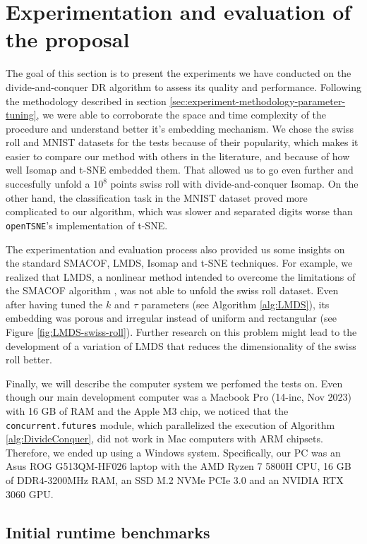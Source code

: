 \section{Experimentation and evaluation of the proposal}
\label{sec:experimentation-and-evaluation}

The goal of this section is to present the experiments we have conducted on the divide-and-conquer DR algorithm to assess its quality and performance. Following the methodology described in section \ref{sec:experiment-methodology-parameter-tuning}, we were able to corroborate the space and time complexity of the procedure and understand better it's embedding mechanism. We chose the swiss roll and MNIST datasets for the tests because of their popularity, which makes it easier to compare our method with others in the literature, and because of how well Isomap and t-SNE embedded them. That allowed us to go even further and succesfully unfold a $10^8$ points swiss roll with divide-and-conquer Isomap. On the other hand, the classification task in the MNIST dataset proved more complicated to our algorithm, which was slower and separated digits worse than \verb|openTSNE|'s implementation of t-SNE.

The experimentation and evaluation process also provided us some insights on the standard SMACOF, LMDS, Isomap and t-SNE techniques. For example, we realized that LMDS, a nonlinear method intended to overcome the limitations of the SMACOF algorithm \citep{Chen2009}, was not able to unfold the swiss roll dataset. Even after having tuned the $k$ and $\tau$ parameters (see Algorithm \ref{alg:LMDS}), its embedding was porous and irregular instead of uniform and rectangular (see Figure \ref{fig:LMDS-swiss-roll}). Further research on this problem might lead to the development of a variation of LMDS that reduces the dimensionality of the swiss roll better.

Finally, we will describe the computer system we perfomed the tests on. Even though our main development computer was a  Macbook Pro (14-inc, Nov 2023) with 16 GB of RAM and the Apple M3 chip, we noticed that the \verb|concurrent.futures| module, which parallelized the execution of Algorithm \ref{alg:DivideConquer}, did not work in Mac computers with ARM chipsets. Therefore, we ended up using a Windows system. Specifically, our PC was an Asus ROG G513QM-HF026 laptop with the AMD Ryzen 7 5800H CPU, 16 GB of DDR4-3200MHz RAM, an SSD M.2 NVMe PCIe 3.0 and an NVIDIA RTX 3060 GPU.

\subsection{Initial runtime benchmarks}
\label{sec:initial-runtime-benchmarks}

